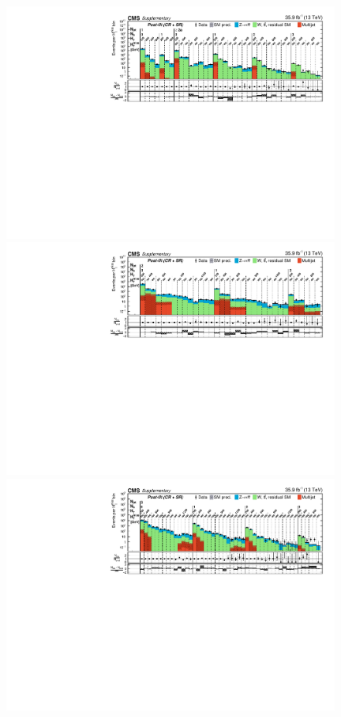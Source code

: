 \begin{figure}
    \begin{center}
            \includegraphics[width=0.98\textwidth]{Supplementary/FullBinning_results_monojet_full-fit-bg_aux}
            \includegraphics[width=0.98\textwidth]{Supplementary/FullBinning_results_2jet_full-fit-bg_aux}\\
            \includegraphics[width=0.98\textwidth]{Supplementary/FullBinning_results_3jet_full-fit-bg_aux}\\

\end{center}
\end{figure}
